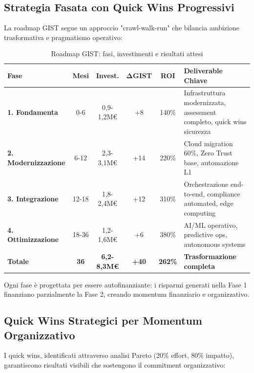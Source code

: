 \subsection{\texorpdfstring{Strategia Fasata con Quick Wins Progressivi}{5.4.1 - Strategia Fasata}}
\label{subsec:5.4.1}

La roadmap GIST segue un approccio "crawl-walk-run" che bilancia ambizione trasformativa e pragmatismo operativo:

\begin{table}[htbp]
\centering
\caption{Roadmap GIST: fasi, investimenti e risultati attesi}
\label{tab:roadmap_detailed}
\begin{tabular}{@{}p{2.5cm}ccccp{4cm}@{}}
\toprule
\textbf{Fase} & \textbf{Mesi} & \textbf{Invest.} & \textbf{ΔGIST} & \textbf{ROI} & \textbf{Deliverable Chiave} \\
\midrule
\rowcolor{blue!5}
\textbf{1. Fondamenta} & 0-6 & 0,9-1,2M€ & +8 & 140\% & Infrastruttura modernizzata, assessment completo, quick wins sicurezza \\
\rowcolor{green!5}
\textbf{2. Modernizzazione} & 6-12 & 2,3-3,1M€ & +14 & 220\% & Cloud migration 60\%, Zero Trust base, automazione L1 \\
\rowcolor{yellow!5}
\textbf{3. Integrazione} & 12-18 & 1,8-2,4M€ & +12 & 310\% & Orchestrazione end-to-end, compliance automated, edge computing \\
\rowcolor{orange!5}
\textbf{4. Ottimizzazione} & 18-36 & 1,2-1,6M€ & +6 & 380\% & AI/ML operativo, predictive ops, autonomous systems \\
\midrule
\textbf{Totale} & \textbf{36} & \textbf{6,2-8,3M€} & \textbf{+40} & \textbf{262\%} & \textbf{Trasformazione completa} \\
\bottomrule
\end{tabular}
\end{table}

Ogni fase è progettata per essere autofinanziante: i risparmi generati nella Fase 1 finanziano parzialmente la Fase 2, creando momentum finanziario e organizzativo.

\subsection{\texorpdfstring{Quick Wins Strategici per Momentum Organizzativo}{5.4.2 - Quick Wins}}
\label{subsec:5.4.2}

I quick wins, identificati attraverso analisi Pareto (20\% effort, 80\% impatto), garantiscono risultati visibili che sostengono il commitment organizzativo:

